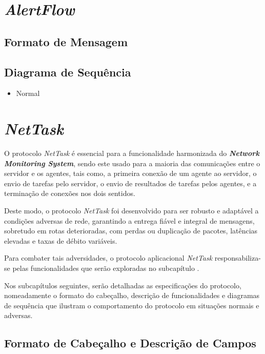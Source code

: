 \documentclass[a4paper,12pt]{scrreprt}
\begin{document}
\section{\textit{AlertFlow}}

\subsection{Formato de Mensagem}

\subsection{Diagrama de Sequência}

\begin{itemize}
    \item Normal
\end{itemize}

\clearpage

\section{\textit{NetTask}}

O protocolo \textit{NetTask} é essencial para a funcionalidade harmonizada do
\textbf{\textit{Network Monitoring System}}, sendo este usado para a maioria
das comunicações entre o servidor e os agentes, tais como, a primeira conexão de
um agente ao servidor, o envio de tarefas pelo servidor, o envio de resultados
de tarefas pelos agentes, e a terminação de conexões nos dois sentidos.

Deste modo, o protocolo \textit{NetTask} foi desenvolvido para ser robusto e
adaptável a condições adversas de rede, garantindo a entrega fiável e integral
de mensagens, sobretudo em rotas deterioradas, com perdas ou duplicação de pacotes,
latências elevadas e taxas de débito variáveis.

Para combater tais adversidades, o protocolo aplicacional \textit{NetTask}
responsabiliza-se pelas funcionalidades que serão exploradas no subcapítulo
.

Nos subcapítulos seguintes, serão detalhadas as especificações do protocolo,
nomeadamente o formato do cabeçalho, descrição de funcionalidades e diagramas de
sequência que ilustram o comportamento do protocolo em situações normais e adversas.

\subsection{Formato de Cabeçalho e Descrição de Campos}
\end{document}
